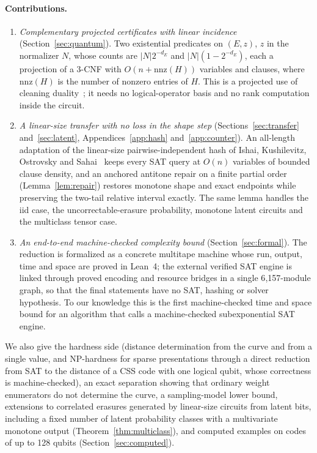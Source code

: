 \documentclass[11pt]{article}
\theoremstyle{remark}
\begin{document}
\paragraph{Contributions.}
\begin{enumerate}
\item \emph{Complementary projected certificates with linear incidence}
 (Section~\ref{sec:quantum}). Two existential predicates on
 \((E,z)\), \(z\) in the normalizer \(N\), whose counts are
 \(|N|2^{-d_E}\) and \(|N|(1-2^{-d_E})\), each a projection of a 3-CNF
 with \(O(n+\mathrm{nnz}(H))\) variables and clauses, where
 \(\mathrm{nnz}(H)\) is the number of nonzero entries of \(H\). This is a
 projected use of cleaning duality~\cite{bravyiterhal2009,kalachevsadov2022};
 it needs no logical-operator basis and no rank computation inside the
 circuit.
\item \emph{A linear-size transfer with no loss in the shape step}
 (Sections~\ref{sec:transfer} and~\ref{sec:latent},
 Appendices~\ref{app:hash} and~\ref{app:counter}). An all-length
 adaptation of the linear-size pairwise-independent hash of
 Ishai, Kushilevitz, Ostrovsky and Sahai~\cite{ikos2008} keeps every SAT
 query at \(O(n)\) variables of bounded clause density, and an anchored
 antitone repair on a finite partial order (Lemma~\ref{lem:repair})
 restores monotone shape and exact endpoints while preserving the
 two-tail relative interval exactly. The same lemma handles the iid
 case, the uncorrectable-erasure probability, monotone latent circuits
 and the multiclass tensor case.
\item \emph{An end-to-end machine-checked complexity bound}
 (Section~\ref{sec:formal}). The reduction is formalized as a concrete
 multitape machine whose run, output, time and space are proved in
 Lean~4; the external verified SAT engine is linked through proved
 encoding and resource bridges in a single 6{,}157-module graph, so that
 the final statements have no SAT, hashing or solver hypothesis. To our
 knowledge this is the first machine-checked time and space bound for an
 algorithm that calls a machine-checked subexponential SAT engine.
\end{enumerate}
We also give the hardness side (distance determination from the curve
and from a single value, and NP-hardness for sparse presentations
through a direct reduction from SAT to the distance of a CSS code with
one logical qubit, whose correctness is machine-checked), an exact separation showing that ordinary weight enumerators
do not determine the curve, a sampling-model lower bound, extensions to
correlated erasures generated by linear-size circuits from latent bits,
including a fixed number of latent probability classes with a
multivariate monotone output (Theorem~\ref{thm:multiclass}), and
computed examples on codes of up to 128 qubits
(Section~\ref{sec:computed}).
\end{document}
